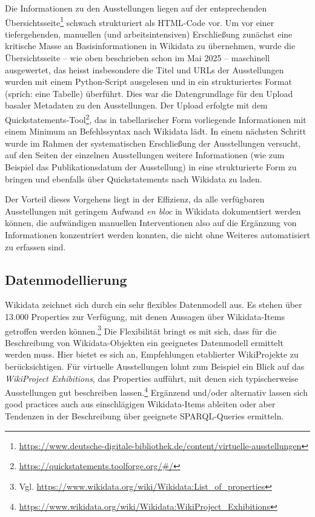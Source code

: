 \documentclass[a4paper,
fontsize=11pt,
oneside,
numbers=noperiodatend,
parskip=half-,
bibliography=totoc,
final
]{scrartcl}
\begin{document}
Die Informationen zu den Ausstellungen liegen auf der entsprechenden
Übersichtsseite\footnote{\url{https://www.deutsche-digitale-bibliothek.de/content/virtuelle-ausstellungen}}
schwach strukturiert als HTML-Code vor. Um vor einer tiefergehenden,
manuellen (und arbeitsintensiven) Erschließung zunächst eine kritische
Masse an Basisinformationen in Wikidata zu übernehmen, wurde die
Übersichtsseite -- wie oben beschrieben schon im Mai 2025 -- maschinell
ausgewertet, das heisst insbesondere die Titel und URLs der
Ausstellungen wurden mit einem Python-Script ausgelesen und in ein
strukturiertes Format (sprich: eine Tabelle) überführt. Dies war die
Datengrundlage für den Upload basaler Metadaten zu den Ausstellungen.
Der Upload erfolgte mit dem Quickstatements-Tool\footnote{\url{https://quickstatements.toolforge.org/\#/}},
das in tabellarischer Form vorliegende Informationen mit einem Minimum
an Befehlssyntax nach Wikidata lädt. In einem nächsten Schritt wurde im
Rahmen der systematischen Erschließung der Ausstellungen versucht, auf
den Seiten der einzelnen Ausstellungen weitere Informationen (wie zum
Beispiel das Publikationsdatum der Ausstellung) in eine strukturierte
Form zu bringen und ebenfalls über Quickstatements nach Wikidata zu
laden.

Der Vorteil dieses Vorgehens liegt in der Effizienz, da alle verfügbaren
Ausstellungen mit geringem Aufwand \emph{en bloc} in Wikidata
dokumentiert werden können, die aufwändigen manuellen Interventionen
also auf die Ergänzung von Informationen konzentriert werden konnten,
die nicht ohne Weiteres automatisiert zu erfassen sind.

\hypertarget{datenmodellierung}{%
\subsection{Datenmodellierung}\label{datenmodellierung}}

Wikidata zeichnet sich durch ein sehr flexibles Datenmodell aus. Es
stehen über 13.000 Properties zur Verfügung, mit denen Aussagen über
Wikidata-Items getroffen werden können.\footnote{Vgl.
  \url{https://www.wikidata.org/wiki/Wikidata:List_of_properties}} Die
Flexibilität bringt es mit sich, dass für die Beschreibung von
Wikidata-Objekten ein geeignetes Datenmodell ermittelt werden muss. Hier
bietet es sich an, Empfehlungen etablierter WikiProjekte zu
berücksichtigen. Für virtuelle Ausstellungen lohnt zum Beispiel ein
Blick auf das \emph{WikiProject Exhibitions}, das Properties aufführt,
mit denen sich typischerweise Ausstellungen gut beschreiben
lassen.\footnote{\url{https://www.wikidata.org/wiki/Wikidata:WikiProject_Exhibitions}}
Ergänzend und/oder alternativ lassen sich good practices auch aus
einschlägigen Wikidata-Items ableiten oder aber Tendenzen in der
Beschreibung über geeignete SPARQL-Queries ermitteln.
\end{document}

